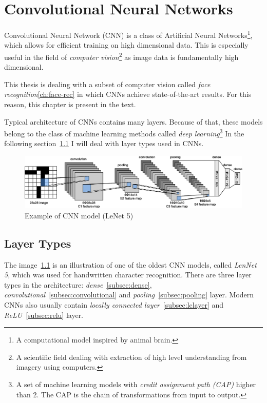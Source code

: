 \chapter{Convolutional Neural Networks}\label{ch:cnn}
Convolutional Neural Network (CNN) is a class of Artificial Neural Networks\footnote{A computational model inspired by
animal brain.}, which allows for efficient training on high dimensional data.
This is especially useful in the field of \textit{computer vision}\footnote{A scientific field dealing with extraction
of high level understanding from imagery using computers.} as image data is fundamentally high dimensional.

This thesis is dealing with a subset of computer vision called \textit{face recognition}\ref{ch:face-rec} in which CNNs
achieve state-of-the-art results.
For this reason, this chapter is present in the text.

Typical architecture of CNNs contains many layers.
Because of that, these models belong to the class of machine learning methods called
\textit{deep learning}\footnote{A set of machine learning models with \textit{credit assignment path (CAP)} higher than 2.
The CAP is the chain of transformations from input to output.}
In the following section~\ref{sec:layer-types} I will deal with layer types used in CNNs.

\begin{figure}[H]
    \centering
    \includegraphics[width=\columnwidth]{images/cnn/lenet.eps}
    \caption{Example of CNN model (LeNet 5)~\cite{LeNet5}}
    \label{fig:cnn}
\end{figure}

\section{Layer Types}\label{sec:layer-types}
The image~\ref{fig:cnn} is an illustration of one of the oldest CNN models, called \textit{LenNet 5}, which was used for
handwritten character recognition.
There are three layer types in the architecture: \textit{dense}~\ref{subsec:dense},
\textit{convolutional}~\ref{subsec:convolutional} and \textit{pooling}~\ref{subsec:pooling} layer.
Modern CNNs also usually contain \textit{locally connected layer}~\ref{subsec:lclayer} and
\textit{ReLU}~\ref{subsec:relu} layer.

